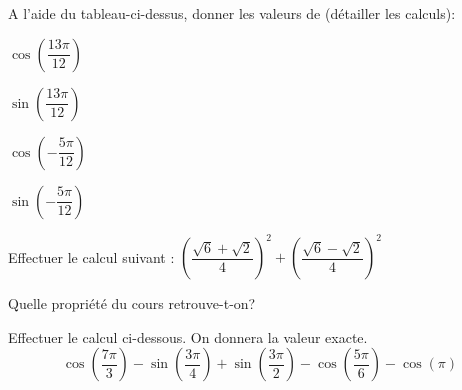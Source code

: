 \documentclass[11pt,a4paper]{article}  %
\begin{document}
\begin{enumMet}
	\item A l'aide du tableau-ci-dessus, donner les valeurs de (détailler les calculs):
	\begin{enumMet}
		\item $\cos\left(\dfrac{13\pi}{12}\right)$
		\item {} $\sin\left(\dfrac{13\pi}{12}\right)$
		\item $\cos\left(-\dfrac{5\pi}{12}\right)$
		\item {} $\sin\left(-\dfrac{5\pi}{12}\right)$
	\end{enumMet}
	\item 
	\begin{enumMet}
		\item Effectuer le calcul suivant : $\left(\dfrac{\sqrt{6}+\sqrt{2}}{4}\right)^2+\left(\dfrac{\sqrt{6}-\sqrt{2}}{4}\right)^2$
		\item Quelle propriété du cours retrouve-t-on?
	\end{enumMet}
\end{enumMet}

Effectuer le calcul ci-dessous. On donnera la valeur exacte.
$$\cos \left(\dfrac{7\pi}{3}\right)-\sin \left(\dfrac{3\pi}{4}\right)+\sin \left(\dfrac{3\pi}{2}\right)-\cos \left(\dfrac{5\pi}{6}\right)-\cos(\pi)$$
\end{document}

